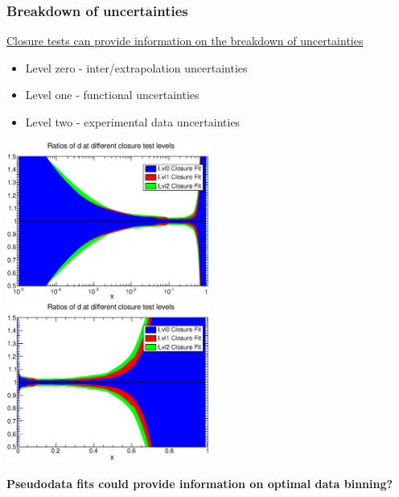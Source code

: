 \documentclass[10pt]{beamer}
\begin{document}
\begin{frame}
\frametitle{Breakdown of uncertainties}
\begin{center}
\underline{Closure tests can provide information on the breakdown of uncertainties}
\end{center}
\begin{itemize}
\item Level zero - inter/extrapolation uncertainties
\item Level one - functional uncertainties
\item Level two - experimental data uncertainties
\end{itemize}

\begin{center}
\includegraphics[width=0.5\textwidth]{figures/CT123ratios_d.eps}
\includegraphics[width=0.5\textwidth]{figures/CT123ratios_d_lin.eps}

\textbf{Pseudodata fits could provide information on optimal data binning?}
\end{center}

\end{frame}
\end{document}
